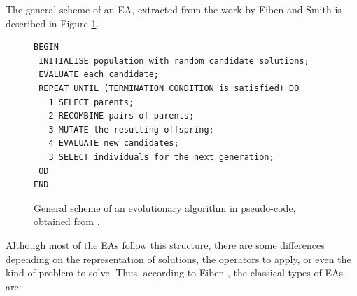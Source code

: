 \documentclass{article}
\begin{document}
The general scheme of an EA, extracted from the work by Eiben and Smith \cite{eiben2010whatis} is described in Figure \ref{fig:basicscheme}.

\begin{figure}[tb]
\begin{verbatim}
BEGIN
 INITIALISE population with random candidate solutions;
 EVALUATE each candidate;
 REPEAT UNTIL (TERMINATION CONDITION is satisfied) DO
   1 SELECT parents;
   2 RECOMBINE pairs of parents;
   3 MUTATE the resulting offspring;
   4 EVALUATE new candidates;
   3 SELECT individuals for the next generation;
 OD
END
\end{verbatim}
\caption{General scheme of an evolutionary algorithm in pseudo-code, obtained from \cite{eiben2010whatis}.}
\label{fig:basicscheme}
\end{figure}

Although most of the EAs follow this structure, there are some differences depending on the representation of solutions, the operators to apply, or even the kind of problem to solve. Thus, according to Eiben \cite{eiben2010whatis}, the classical types of EAs are:


\end{document}
